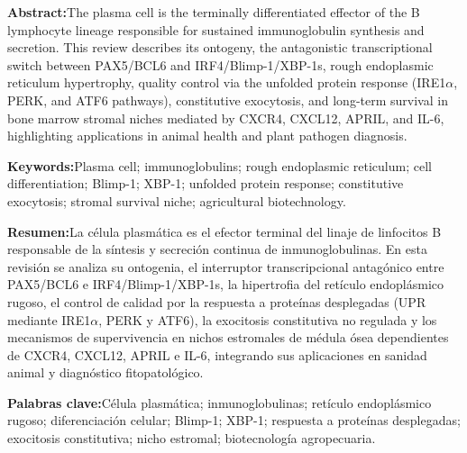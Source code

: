 \documentclass[spanish,letterpaper,oneside]{article}
\begin{document}
{  \noindent\begin{minipage}[t]{0.485\textwidth}
  \begin{tcolorbox}[colback=abstractboxbg, colframe=abstractboxborder, boxrule=0.6pt, arc=1.5mm, left=6pt, right=6pt, top=5pt, bottom=5pt]
  {\fontsize{7.8}{9.8}\selectfont
  \textbf{Abstract:}\enspace The plasma cell is the terminally differentiated effector of the B lymphocyte lineage responsible for sustained immunoglobulin synthesis and secretion. This review describes its ontogeny, the antagonistic transcriptional switch between PAX5/BCL6 and IRF4/Blimp-1/XBP-1s, rough endoplasmic reticulum hypertrophy, quality control via the unfolded protein response (IRE1$\alpha$, PERK, and ATF6 pathways), constitutive exocytosis, and long-term survival in bone marrow stromal niches mediated by CXCR4, CXCL12, APRIL, and IL-6, highlighting applications in animal health and plant pathogen diagnosis.
  \par\vspace{0.08cm}
  \textbf{Keywords:}\enspace Plasma cell; immunoglobulins; rough endoplasmic reticulum; cell differentiation; Blimp-1; XBP-1; unfolded protein response; constitutive exocytosis; stromal survival niche; agricultural biotechnology.
  }
  \end{tcolorbox}
  \end{minipage}\hfill
  \begin{minipage}[t]{0.485\textwidth}
  \begin{tcolorbox}[colback=resumenboxbg, colframe=resumenboxborder, boxrule=0.6pt, arc=1.5mm, left=6pt, right=6pt, top=5pt, bottom=5pt]
  {\fontsize{7.8}{9.8}\selectfont
  \textbf{Resumen:}\enspace La célula plasmática es el efector terminal del linaje de linfocitos B responsable de la síntesis y secreción continua de inmunoglobulinas. En esta revisión se analiza su ontogenia, el interruptor transcripcional antagónico entre PAX5/BCL6 e IRF4/Blimp-1/XBP-1s, la hipertrofia del retículo endoplásmico rugoso, el control de calidad por la respuesta a proteínas desplegadas (UPR mediante IRE1$\alpha$, PERK y ATF6), la exocitosis constitutiva no regulada y los mecanismos de supervivencia en nichos estromales de médula ósea dependientes de CXCR4, CXCL12, APRIL e IL-6, integrando sus aplicaciones en sanidad animal y diagnóstico fitopatológico.
  \par\vspace{0.08cm}
  \textbf{Palabras clave:}\enspace Célula plasmática; inmunoglobulinas; retículo endoplásmico rugoso; diferenciación celular; Blimp-1; XBP-1; respuesta a proteínas desplegadas; exocitosis constitutiva; nicho estromal; biotecnología agropecuaria.
  }
  \end{tcolorbox}
  \end{minipage}
  \vspace{0.12cm}

}
\end{document}
